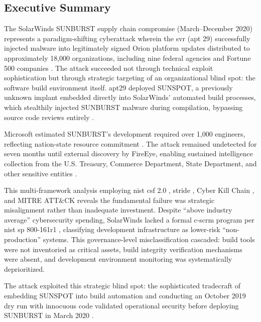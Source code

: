 \subsection*{Executive Summary}

The SolarWinds SUNBURST supply chain compromise (March--December 2020) represents a paradigm-shifting cyberattack wherein the \gls{svr} (\gls{apt} 29) successfully injected malware into legitimately signed Orion platform updates distributed to approximately 18,000 organizations, including nine federal agencies and Fortune 500 companies \cite{crowdstrike_sunspot_2021, fireeye_highly_2020, nagle_solarwinds_2023}. The attack succeeded not through technical exploit sophistication but through strategic targeting of an organizational blind spot: the software build environment itself. \gls{apt}29 deployed SUNSPOT, a previously unknown implant embedded directly into SolarWinds' automated build processes, which stealthily injected SUNBURST malware during compilation, bypassing source code reviews entirely \cite{crowdstrike_sunspot_2021, us_open_2021}.

Microsoft estimated SUNBURST's development required over 1,000 engineers, reflecting nation-state resource commitment \cite{microsoft_analyzing_2020, nagle_solarwinds_2023}. The attack remained undetected for seven months until external discovery by FireEye, enabling sustained intelligence collection from the U.S. Treasury, Commerce Department, State Department, and other sensitive entities \cite{us_open_2021}.

 This multi-framework analysis employing \gls{nist} \gls{csf} 2.0 \cite{pascoe_nist_2024}, \gls{stride} \cite{kohnfelder_threats_1999}, Cyber Kill Chain \cite{hutchins_intelligence_2011}, and MITRE ATT\&CK \cite{strom_mitre_2018} reveals the fundamental failure was strategic misalignment rather than inadequate investment. Despite ``above industry average'' cybersecurity spending, SolarWinds lacked a formal \gls{c-scrm} program per \gls{nist} \gls{sp} 800-161r1 \cite{boyens_cybersecurity_2024}, classifying development infrastructure as lower-risk ``non-production'' systems. This governance-level misclassification cascaded: build tools were not inventoried as critical assets, build integrity verification mechanisms were absent, and development environment monitoring was systematically deprioritized.

The attack exploited this strategic blind spot: the sophisticated tradecraft of embedding SUNSPOT into build automation and conducting an October 2019 dry run with innocuous code validated operational security before deploying SUNBURST in March 2020 \cite{us_open_2021}.

